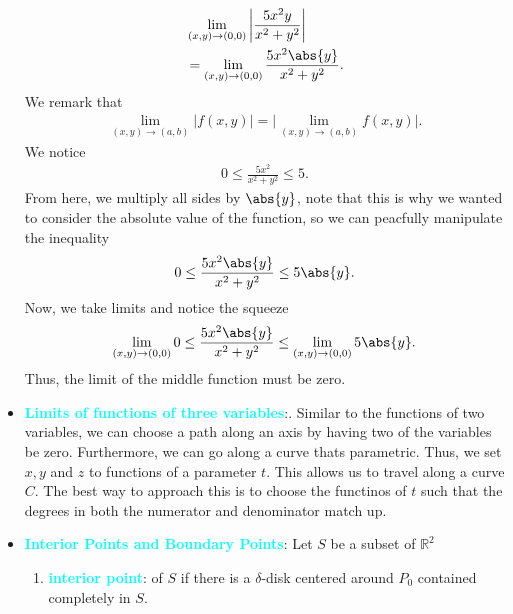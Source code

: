 \documentclass{report}
\begin{document}
\begin{itemize}
\begin{align*}
                    &\lim\limits_{(x,y) \to (0,0)}{\bigg\lvert \frac{5x^{2}y}{x^{2}+y^{2}} \bigg\rvert} \\
                    &=\lim\limits_{(x,y) \to (0,0)}{\frac{5x^{2}\abs{y}}{x^{2}+y^{2}} }
                .\end{align*}
                \bigbreak \noindent 
                We remark that 
                \begin{align*}
                    \lim\limits_{(x,y) \to (a,b)}{\bigg\lvert f(x,y) \bigg\rvert} = \bigg\lvert \lim\limits_{(x,y) \to (a,b)}{f(x,y)} \bigg\rvert
                .\end{align*}
                \bigbreak \noindent 
                We notice
                \begin{align*}
                    0 \leq \frac{5x^{2}}{x^{2}+y^{2}} \leq 5
                .\end{align*}
                From here, we multiply all sides by $\abs{y}$, note that this is why we wanted to consider the absolute value of the function, so we can peacfully manipulate the inequality
                \begin{align*}
                    0 \leq \frac{5x^{2}\abs{y}}{x^{2}+y^{2}} \leq 5\abs{y}
                .\end{align*}
                Now, we take limits and notice the squeeze
                \begin{align*}
                    \lim\limits_{(x,y) \to (0,0)}{0} \leq \frac{5x^{2}\abs{y}}{x^{2}+y^{2}} \leq \lim\limits_{(x,y) \to (0,0)}{5\abs{y}}
                .\end{align*}
                \bigbreak \noindent 
                Thus, the limit of the middle function must be zero.
            \item \textbf{\textcolor{cyan}{Limits of functions of three variables}}:. Similar to the functions of two variables, we can choose a path along an axis by having two of the variables be zero. Furthermore, we can go along a curve thats parametric. Thus, we set $x,y$ and $z$ to functions of a parameter $t$. This allows us to travel along a curve $C$. The best way to approach this is to choose the functinos of $t$ such that the degrees in both the numerator and denominator match up.
            \item \textbf{\textcolor{cyan}{Interior Points and Boundary Points}}:
                Let $S$ be a subset of $\mathbb{R}^2$ 
                \begin{enumerate}[label=(\alph*)]
                    \item \textbf{\textcolor{cyan}{interior point}}: of $S$ if there is a $\delta$-disk centered around $P_0$ contained completely in $S$.

\end{enumerate}
\end{itemize}
\end{document}
